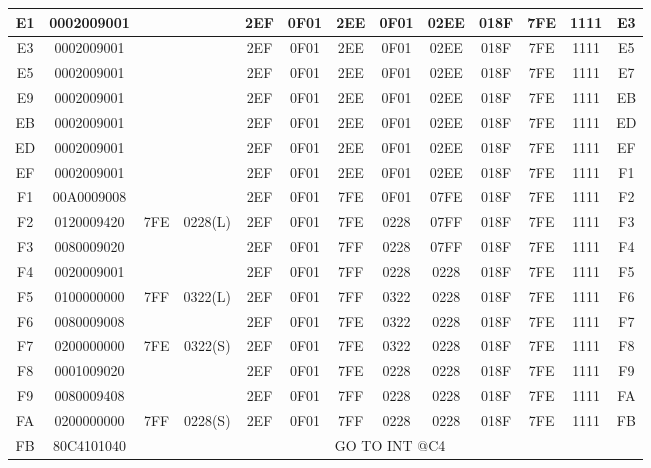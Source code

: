 {\begin{flushleft}
\begin{tabular}{|c|c|c|c|c|c|c|c|c|c|c|c|c|}
            E1       & 0002009001 &       &          & 2EF & 0F01 & 2EE & 0F01 & 02EE & 018F & 7FE & 1111 & E3 \\
            \hline
            E3       & 0002009001 &       &          & 2EF & 0F01 & 2EE & 0F01 & 02EE & 018F & 7FE & 1111 & E5 \\
            \hline
            E5       & 0002009001 &       &          & 2EF & 0F01 & 2EE & 0F01 & 02EE & 018F & 7FE & 1111 & E7 \\
            \hline
            E9       & 0002009001 &       &          & 2EF & 0F01 & 2EE & 0F01 & 02EE & 018F & 7FE & 1111 & EB \\
            \hline
            EB       & 0002009001 &       &          & 2EF & 0F01 & 2EE & 0F01 & 02EE & 018F & 7FE & 1111 & ED \\
            \hline
            ED       & 0002009001 &       &          & 2EF & 0F01 & 2EE & 0F01 & 02EE & 018F & 7FE & 1111 & EF \\
            \hline
            EF       & 0002009001 &       &          & 2EF & 0F01 & 2EE & 0F01 & 02EE & 018F & 7FE & 1111 & F1 \\
            \hline
            F1       & 00A0009008 &       &          & 2EF & 0F01 & 7FE & 0F01 & 07FE & 018F & 7FE & 1111 & F2 \\
            \hline
            F2       & 0120009420 & 7FE   & 0228(L)  & 2EF & 0F01 & 7FE & 0228 & 07FF & 018F & 7FE & 1111 & F3 \\
            \hline
            F3       & 0080009020 &       &          & 2EF & 0F01 & 7FF & 0228 & 07FF & 018F & 7FE & 1111 & F4 \\
            \hline
            F4       & 0020009001 &       &          & 2EF & 0F01 & 7FF & 0228 & 0228 & 018F & 7FE & 1111 & F5 \\
            \hline
            F5       & 0100000000 & 7FF   & 0322(L)  & 2EF & 0F01 & 7FF & 0322 & 0228 & 018F & 7FE & 1111 & F6 \\
            \hline
            F6       & 0080009008 &       &          & 2EF & 0F01 & 7FE & 0322 & 0228 & 018F & 7FE & 1111 & F7 \\
            \hline
            F7       & 0200000000 & 7FE   & 0322(S)  & 2EF & 0F01 & 7FE & 0322 & 0228 & 018F & 7FE & 1111 & F8 \\
            \hline
            F8       & 0001009020 &       &          & 2EF & 0F01 & 7FE & 0228 & 0228 & 018F & 7FE & 1111 & F9 \\
            \hline
            F9       & 0080009408 &       &          & 2EF & 0F01 & 7FF & 0228 & 0228 & 018F & 7FE & 1111 & FA \\
            \hline
            FA       & 0200000000 & 7FF   & 0228(S)  & 2EF & 0F01 & 7FF & 0228 & 0228 & 018F & 7FE & 1111 & FB \\
            \hline
            FB & 80C4101040 & \multicolumn{11}{1}{GO TO INT @C4} \\
            \hline

        \end{tabular}
    \end{flushleft}
}
\newpage


